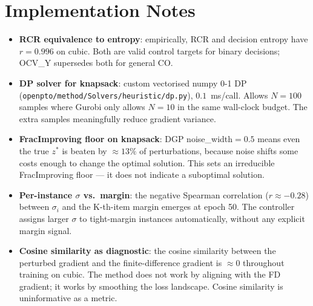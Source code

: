 \documentclass[11pt]{article}
\begin{document}
\appendix
\section{Implementation Notes}

\begin{itemize}[itemsep=4pt]

  \item \textbf{RCR equivalence to entropy}: empirically, RCR and
    decision entropy have $r = 0.996$ on cubic.  Both are valid control
    targets for binary decisions; OCV\_Y supersedes both for general CO.

  \item \textbf{DP solver for knapsack}: custom vectorised numpy
    0-1 DP (\texttt{openpto/method/Solvers/heuristic/dp.py}),
    $0.1$~ms/call.  Allows $N = 100$ samples where Gurobi only allows
    $N = 10$ in the same wall-clock budget.  The extra samples
    meaningfully reduce gradient variance.

  \item \textbf{FracImproving floor on knapsack}: DGP noise\_width$=0.5$
    means even the true $z^*$ is beaten by $\approx 13\%$ of perturbations,
    because noise shifts some costs enough to change the optimal solution.
    This sets an irreducible FracImproving floor --- it does not indicate
    a suboptimal solution.

  \item \textbf{Per-instance $\sigma$ vs.\ margin}: the negative
    Spearman correlation ($r \approx -0.28$) between $\sigma_i$ and
    the K-th-item margin emerges at epoch 50.  The controller assigns
    larger $\sigma$ to tight-margin instances automatically, without
    any explicit margin signal.

  \item \textbf{Cosine similarity as diagnostic}: the cosine similarity
    between the perturbed gradient and the finite-difference gradient is
    $\approx 0$ throughout training on cubic.  The method does not
    work by aligning with the FD gradient; it works by smoothing
    the loss landscape.  Cosine similarity is uninformative as a metric.

\end{itemize}
\end{document}
